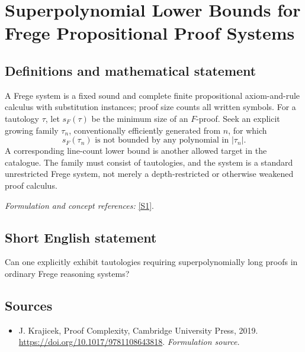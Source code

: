 \documentclass[11pt]{article}
\begin{document}
\section*{\texorpdfstring{Superpolynomial Lower Bounds for Frege Propositional Proof Systems}{Superpolynomial Lower Bounds for Frege Propositional Proof Systems}}\label{30006730}
\subsection{Definitions and mathematical statement}
A Frege system is a fixed sound and complete finite propositional axiom-and-rule calculus with substitution instances; proof size counts all written symbols. For a tautology $\tau$, let $s_F(\tau)$ be the minimum size of an $F$-proof. Seek an explicit growing family $\tau_n$, conventionally efficiently generated from $n$, for which
\[
 s_F(\tau_n)\text{ is not bounded by any polynomial in }|\tau_n|.
\]
A corresponding line-count lower bound is another allowed target in the catalogue. The family must consist of tautologies, and the system is a standard unrestricted Frege system, not merely a depth-restricted or otherwise weakened proof calculus.
\par\smallskip\textit{Formulation and concept references:} \href{https://doi.org/10.1017/9781108643818}{[S1]}.

\subsection{Short English statement}
Can one explicitly exhibit tautologies requiring superpolynomially long proofs in ordinary Frege reasoning systems?
\subsection{Sources}
\begin{itemize}
\item[S1]J. Krajicek, Proof Complexity, Cambridge University Press, 2019.
\url{https://doi.org/10.1017/9781108643818}.
\textit{Formulation source.}
\end{itemize}
\end{document}
